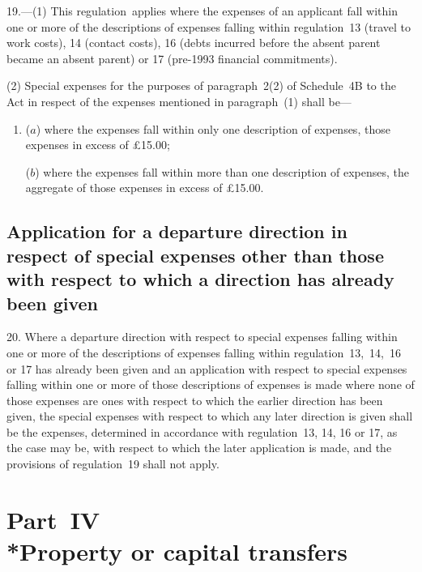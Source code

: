 \documentclass[12pt,a4paper]{article}
\begin{document}
19.—(1)
This regulation~applies where the expenses of an applicant fall within one or
more of the descriptions of expenses falling within regulation~13 (travel to
work costs), 14 (contact costs), 16 (debts incurred before the absent parent
became an absent parent) or 17 (pre-1993 financial commitments).

(2) Special expenses for the purposes of paragraph~2(2) of Schedule~4B to the
Act in respect of the expenses mentioned in paragraph~(1) shall be—
\begin{enumerate}\item[]
($a$) where the expenses fall within only one description of expenses, those
expenses in excess of £15$.$00;

($b$) where the expenses fall within more than one description of expenses, the
aggregate of those expenses in excess of £15$.$00.
\end{enumerate}

\subsection[20. Application for a departure direction in respect of special expenses other than
those with respect to which a direction has already been given]{Application for a departure direction in respect of special expenses other than
those with respect to which a direction has already been given}

20. Where a
departure direction with respect to special expenses falling within one or more
of the descriptions of expenses falling within regulation~13,~14,~16 or 17 has
already been given and an application with respect to special expenses falling
within one or more of those descriptions of expenses is made where none of those
expenses are ones with respect to which the earlier direction has been given,
the special expenses with respect to which any later direction is given shall be
the expenses, determined in accordance with regulation~13, 14, 16 or 17, as the
case may be, with respect to which the later application is made, and the
provisions of regulation~19 shall not apply.

\section[Part~IV --- Property or capital transfers]{Part~IV\\*Property or capital transfers}

\renewcommand\parthead{--- Part~IV}
\end{document}
